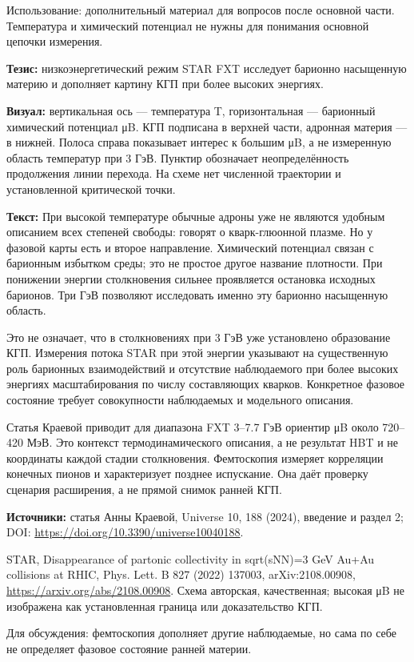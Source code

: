 \documentclass[11pt,a4paper]{article}
\begin{document}
Использование: дополнительный материал для вопросов после основной части. Температура и химический потенциал не нужны для понимания основной цепочки измерения.

\textbf{Тезис:} низкоэнергетический режим STAR FXT исследует барионно насыщенную материю и дополняет картину КГП при более высоких энергиях.

\textbf{Визуал:} вертикальная ось — температура T, горизонтальная — барионный химический потенциал μB. КГП подписана в верхней части, адронная материя — в нижней. Полоса справа показывает интерес к большим μB, а не измеренную область температур при 3 ГэВ. Пунктир обозначает неопределённость продолжения линии перехода. На схеме нет численной траектории и установленной критической точки.

\textbf{Текст:} При высокой температуре обычные адроны уже не являются удобным описанием всех степеней свободы: говорят о кварк-глюонной плазме. Но у фазовой карты есть и второе направление. Химический потенциал связан с барионным избытком среды; это не простое другое название плотности. При понижении энергии столкновения сильнее проявляется остановка исходных барионов. Три ГэВ позволяют исследовать именно эту барионно насыщенную область.

Это не означает, что в столкновениях при 3 ГэВ уже установлено образование КГП. Измерения потока STAR при этой энергии указывают на существенную роль барионных взаимодействий и отсутствие наблюдаемого при более высоких энергиях масштабирования по числу составляющих кварков. Конкретное фазовое состояние требует совокупности наблюдаемых и модельного описания.

Статья Краевой приводит для диапазона FXT 3–7.7 ГэВ ориентир μB около 720–420 МэВ. Это контекст термодинамического описания, а не результат HBT и не координаты каждой стадии столкновения. Фемтоскопия измеряет корреляции конечных пионов и характеризует позднее испускание. Она даёт проверку сценария расширения, а не прямой снимок ранней КГП.

\textbf{Источники:} статья Анны Краевой, Universe 10, 188 (2024), введение и раздел 2; DOI: \url{https://doi.org/10.3390/universe10040188}.

STAR, Disappearance of partonic collectivity in sqrt(sNN)=3 GeV Au+Au collisions at RHIC, Phys. Lett. B 827 (2022) 137003, arXiv:2108.00908, \url{https://arxiv.org/abs/2108.00908}. Схема авторская, качественная; высокая μB не изображена как установленная граница или доказательство КГП.

Для обсуждения: фемтоскопия дополняет другие наблюдаемые, но сама по себе не определяет фазовое состояние ранней материи.
\end{document}
